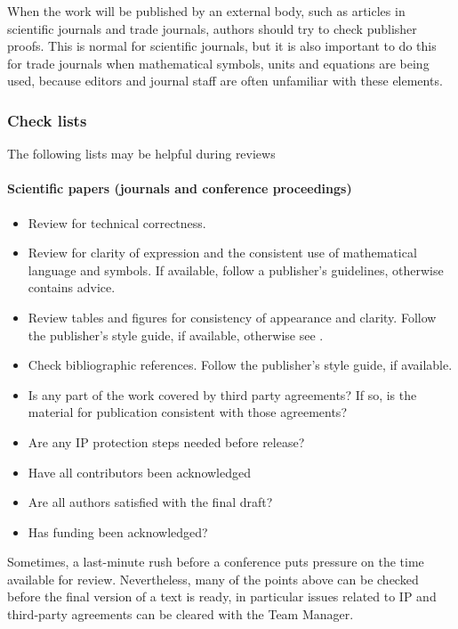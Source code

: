 When the work will be published by an external body, such as articles in scientific journals and trade journals, authors should try to check publisher proofs. This is normal for scientific journals, but it is also important to do this for trade journals when mathematical symbols, units and equations are being used, because editors and journal staff are often unfamiliar with these elements.  

\subsubsection{Check lists}
The following lists may be helpful during reviews
\paragraph{Scientific papers (journals and conference proceedings)}
\begin{itemize}
\item  Review for technical correctness.
\item  Review for clarity of expression and the consistent use of mathematical language and symbols.  If available, follow a publisher’s guidelines, otherwise \cite{MSL_Reporting_Guidelines} contains advice.
\item  Review tables and figures for consistency of appearance and clarity. Follow the publisher’s style guide, if available, otherwise see \cite{MSL_Reporting_Guidelines}.
\item  Check bibliographic references. Follow the publisher’s style guide, if available.
\item  Is any part of the work covered by third party agreements? If so, is the material for publication consistent with those agreements? 
\item  Are any IP protection steps needed before release?
\item  Have all contributors been acknowledged
\item  Are all authors satisfied with the final draft?
\item  Has funding been acknowledged?
\end{itemize}

Sometimes, a last-minute rush before a conference puts pressure on the time available for review. Nevertheless, many of the points above can be checked before the final version of a text is ready, in particular issues related to IP and third-party agreements can be cleared with the Team Manager.


